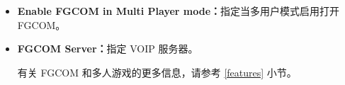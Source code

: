 \begin{itemize}
\item \textbf{Enable FGCOM in Multi Player mode：}指定当多用户模式启用打开 FGCOM。
\item \textbf{FGCOM Server：}指定 VOIP 服务器。

有关 FGCOM 和多人游戏的更多信息，请参考 \ref{features} 小节。
\fi
%
%
%


\end{itemize}
